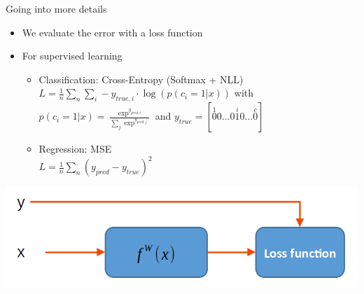 \documentclass[usenames,dvipsnames]{beamer}
\begin{document}
    \begin{frame}{\secname}{\subsecname}
        Going into more details
        \begin{itemize}
            \item We evaluate the error with a \alert{loss} function
            \item For supervised learning
            \begin{itemize}
            	\item Classification: Cross-Entropy (Softmax + NLL) \\
            	\vspace{0.5em}
            	$L = \frac{1}{n} \sum_n \sum_i -y_{true, i} \cdot \log(p(c_i=1| x))$ with $p(c_i=1| x) = \frac{\exp^{y_{pred,i}}}{\sum_j \exp^{y_{pred,j}}}$ and $y_{true} = [\overset{1}{0} 0 \dots 0 \overset{i}{1} 0\dots \overset{c}{0}]$
            	\vspace{0.5em}
            	\item Regression: MSE\\ 
            	\vspace{0.5em}
            	$L = \frac{1}{n}\sum_n (y_{pred}-y_{true})^2$
            \end{itemize}
        \end{itemize}
        \begin{center}
            \includegraphics[width=0.78\linewidth]{figures/DL_fundamentals/DL_training_process_detail.png}
        \end{center}
    \end{frame}
\end{document}
